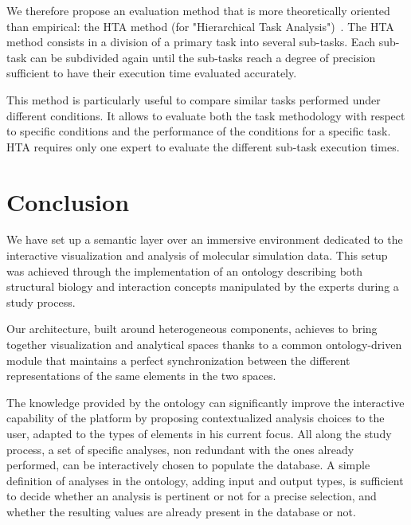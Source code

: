 \documentclass{vgtc}                          %
\begin{document}
We therefore propose an evaluation method that is more theoretically oriented than empirical: the HTA method (for "Hierarchical Task Analysis")~\cite{annett2003hierarchical}. The HTA method consists in a division of a primary task into several sub-tasks. Each sub-task can be subdivided again until the sub-tasks reach a degree of precision sufficient to have their execution time evaluated accurately.

This method is particularly useful to compare similar tasks performed under different conditions. It allows to evaluate both the task methodology with respect to specific conditions and the performance of the conditions for a specific task. HTA requires only one expert to evaluate the different sub-task execution times.

\section{Conclusion}

We have set up a semantic layer over an immersive environment dedicated to the interactive visualization and analysis of molecular simulation data. This setup was achieved through the implementation of an ontology describing both structural biology and interaction concepts manipulated by the experts during a study process.

Our architecture, built around heterogeneous components, achieves to bring together visualization and analytical spaces thanks to a common ontology-driven module that maintains a perfect synchronization between the different representations of the same elements in the two spaces.

The knowledge provided by the ontology can significantly improve the interactive capability of the platform by proposing contextualized analysis choices to the user, adapted to the types of elements in his current focus. All along the study process, a set of specific analyses, non redundant with the ones already performed, can be interactively chosen to populate the database. A simple definition of analyses in the ontology, adding input and output types, is sufficient to decide whether an analysis is pertinent or not for a precise selection, and whether the resulting values are already present in the database or not.
\end{document}
